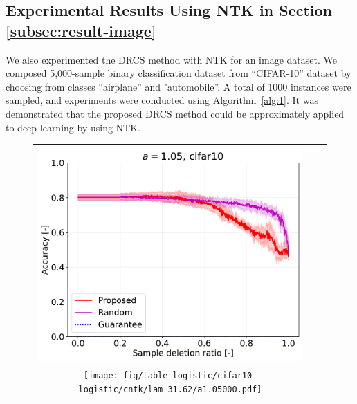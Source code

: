 \subsection{Experimental Results Using NTK in Section \ref{subsec:result-image}} \label{app:result-ntk}

%
We also experimented the DRCS method with NTK for an image dataset.
%
We composed 5,000-sample binary classification dataset from “CIFAR-10” dataset by choosing from classes “airplane” and "automobile”.
%
A total of 1000 instances were sampled, and experiments were conducted using Algorithm~\ref{alg:1}.
%
It was demonstrated that the proposed DRCS method could be approximately applied to deep learning by using NTK.
%
\begin{figure}[H]
\begin{tabular}{ccc}
\begin{minipage}[b]{0.3\hsize}\centering {\small Dataset: CIFAR10, $\lambda=n \cdot 10^{-3}$}\\\includegraphics[width=0.8\hsize]{fig/table_logistic/cifar10-logistic/cntk/lam_1_/a1.05000.pdf}\end{minipage}
&
\begin{minipage}[b]{0.3\hsize}\centering {\small Dataset: CIFAR10, $\lambda=n \cdot 10^{-1.5}$}\\\texttt{[image: fig/table\_logistic/cifar10-logistic/cntk/lam\_31.62/a1.05000.pdf]}\end{minipage}
&

\end{tabular}
\end{figure}
